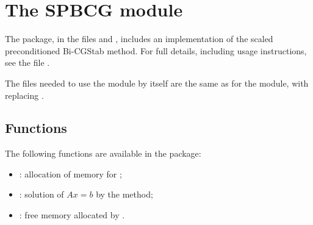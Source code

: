 
\section{The SPBCG module}\label{ss:spbcg}

The {\spbcg} package, in the files  and , includes an
implementation of the scaled preconditioned Bi-CGStab method.  
For full details, including usage instructions, see the file .

The files needed to use the {\spbcg} module by itself are the same as for the
{\spgmr} module, with  replacing .

\subsection{Functions}
The following functions are available in the {\spbcg} package:  
\begin{itemize}
\item {}: allocation of memory for ;
\item {}: solution of $Ax = b$ by the {\spbcg} method;
\item {}: free memory allocated by .
\end{itemize}
